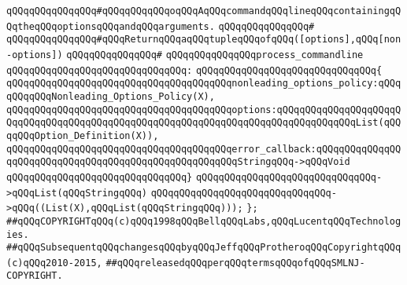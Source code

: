 \verb|qQQqqQQqqQQqqQQq#qQQqqQQqqQQqoqQQqAqQQqcommandqQQqlineqQQqcontainingqQQqtheqQQqoptionsqQQqandqQQqarguments.|\newline
\verb|qQQqqQQqqQQqqQQq#|\newline
\verb|qQQqqQQqqQQqqQQq#qQQqReturnqQQqaqQQqtupleqQQqofqQQq([options],qQQq[non-options])|\newline
\verb|qQQqqQQqqQQqqQQq#|\newline
\verb|qQQqqQQqqQQqqQQqprocess_commandline|\newline
\verb|qQQqqQQqqQQqqQQqqQQqqQQqqQQqqQQq:|\newline
\verb|qQQqqQQqqQQqqQQqqQQqqQQqqQQqqQQq{|\newline
\verb|qQQqqQQqqQQqqQQqqQQqqQQqqQQqqQQqqQQqqQQqnonleading_options_policy:qQQqqQQqqQQqNonleading_Options_Policy(X),|\newline
\verb|qQQqqQQqqQQqqQQqqQQqqQQqqQQqqQQqqQQqqQQqoptions:qQQqqQQqqQQqqQQqqQQqqQQqqQQqqQQqqQQqqQQqqQQqqQQqqQQqqQQqqQQqqQQqqQQqqQQqqQQqqQQqqQQqList(qQQqqQQqOption_Definition(X)),|\newline
\verb|qQQqqQQqqQQqqQQqqQQqqQQqqQQqqQQqqQQqqQQqerror_callback:qQQqqQQqqQQqqQQqqQQqqQQqqQQqqQQqqQQqqQQqqQQqqQQqqQQqqQQqStringqQQq->qQQqVoid|\newline
\verb|qQQqqQQqqQQqqQQqqQQqqQQqqQQqqQQq}|\newline
\verb|qQQqqQQqqQQqqQQqqQQqqQQqqQQqqQQq->qQQqList(qQQqStringqQQq)|\newline
\verb|qQQqqQQqqQQqqQQqqQQqqQQqqQQqqQQq->qQQq((List(X),qQQqList(qQQqStringqQQq)));|\newline
\newline
\verb|};|\newline
\newline
\newline
\newline
\verb|##qQQqCOPYRIGHTqQQq(c)qQQq1998qQQqBellqQQqLabs,qQQqLucentqQQqTechnologies.|\newline
\verb|##qQQqSubsequentqQQqchangesqQQqbyqQQqJeffqQQqProtheroqQQqCopyrightqQQq(c)qQQq2010-2015,|\newline
\verb|##qQQqreleasedqQQqperqQQqtermsqQQqofqQQqSMLNJ-COPYRIGHT.|\newline

